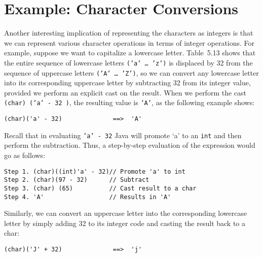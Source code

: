 \section{Example: Character Conversions }
\label{example-character-conversions}
\noindent Another interesting implication of representing the
characters as integers is that we can
represent various character operations in terms of integer
operations. For example, suppose we want to capitalize a lowercase
letter. Table~5.13 shows that the entire sequence of lowercase
letters {\tt ('a'~\dots~'z')} is displaced by 32 from the sequence of
uppercase letters {\tt ('A'~\dots~'Z')}, so we can convert any lowercase
letter into its corresponding uppercase letter by subtracting 32 from
its integer value, provided we perform an explicit cast on the
result. When we perform the cast {\tt (char) ('a'~-~32 )}, the
resulting value is {\tt 'A'}, as the following example shows:

\begin{jjjlisting}
\begin{lstlisting}
(char)('a' - 32)              ==>  'A'
\end{lstlisting}
\end{jjjlisting}

\noindent Recall that in evaluating  {\tt 'a' - 32}
Java will promote `a' to an {\tt int} and then perform the
subtraction.  Thus, a step-by-step evaluation of the expression
would go as follows:

\begin{jjjlisting}
\begin{lstlisting}
Step 1. (char)((int)'a' - 32)// Promote 'a' to int
Step 2. (char)(97 - 32)      // Subtract
Step 3. (char) (65)          // Cast result to a char
Step 4. 'A'                  // Results in 'A'
\end{lstlisting}
\end{jjjlisting}

\noindent Similarly, we can convert an uppercase letter into the corresponding
lowercase letter by simply adding 32 to its integer code and casting
the result back to a char:

\begin{jjjlisting}
\begin{lstlisting}
(char)('J' + 32)              ==>  'j'
\end{lstlisting}
\end{jjjlisting}

